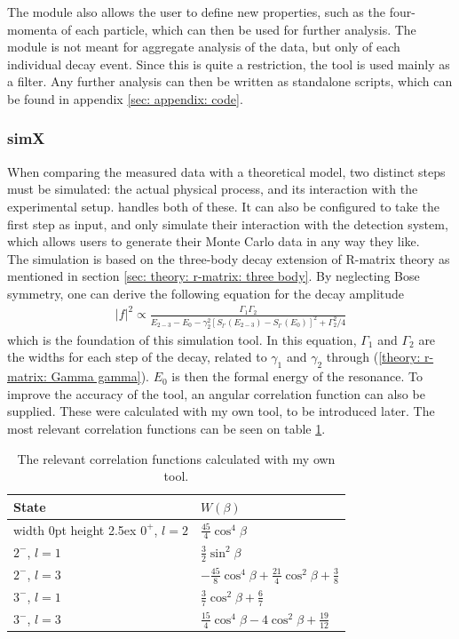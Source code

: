 The module also allows the user to define new properties, such as the four-momenta of each particle, which can then be used for further analysis. The module is not meant for aggregate analysis of the data, but only of each individual decay event. Since this is quite a restriction, the tool is used mainly as a filter. Any further analysis can then be written as standalone \CPP{} scripts, which can be found in appendix \ref{sec: appendix: code}. 

\subsubsection{simX}
When comparing the measured data with a theoretical model, two distinct steps must be simulated: the actual physical process, and its interaction with the experimental setup. \simX{} handles both of these. It can also be configured to take the first step as input, and only simulate their interaction with the detection system, which allows users to generate their Monte Carlo data in any way they like. \\

The simulation is based on the three-body decay extension of R-matrix theory as mentioned in section \ref{sec: theory: r-matrix: three body}. By neglecting Bose symmetry, one can derive the following equation for the decay amplitude \cite{Lane}
\begin{align*}
	|f|^2 \propto \frac{\Gamma_1\Gamma_2}{E_{2-3} - E_0 - \gamma_2^2[S_{l'}(E_{2-3}) - S_{l'}(E_0)]^2 + \Gamma_2^2/4}
\end{align*}
which is the foundation of this simulation tool. In this equation, $\Gamma_1$ and $\Gamma_2$ are the widths for each step of the decay, related to $\gamma_1$ and $\gamma_2$ through (\ref{theory: r-matrix: Gamma gamma}). $E_0$ is then the formal energy of the  resonance. To improve the accuracy of the tool, an angular correlation function can also be supplied. These were calculated with my own tool, to be introduced later. The most relevant correlation functions can be seen on table \ref{table: datared: Wtheta}. \\

\begin{table}
	\vspace{-16pt}
	\begin{tabular}{ll}
		State       & $W(\beta)$ \\ \hline \vrule width 0pt height 2.5ex
		$0^+$, $l=2$ & $\frac{45}{4}\cos^4\beta$ \\[3pt]
		$2^-$, $l=1$ & $\frac{3}{2}\sin^2\beta$ \\[3pt]
		$2^-$, $l=3$ & $-\frac{45}{8}\cos^4\beta + \frac{21}{4}\cos^2\beta + \frac{3}{8}$ \\[3pt]
		$3^-$, $l=1$ & $\frac{3}{7}\cos^2\beta + \frac{6}{7}$ \\[3pt]
		$3^-$, $l=3$ & $\frac{15}{4}\cos^4\beta - 4\cos^2\beta + \frac{19}{12}$
	\end{tabular}
	\caption{The relevant correlation functions calculated with my own tool.}
	\label{table: datared: Wtheta}
\end{table}


